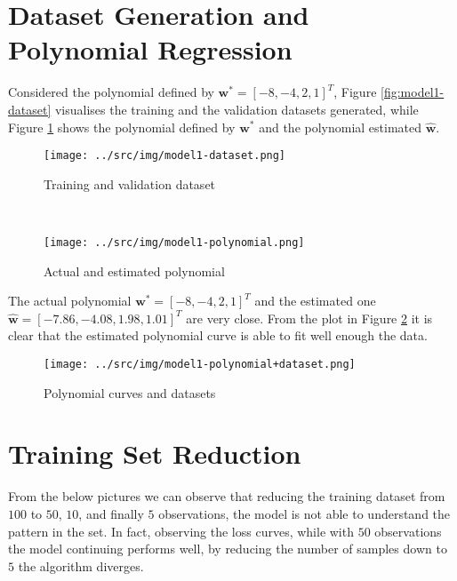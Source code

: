 \documentclass[a4paper,12pt]{article} %
\begin{document}
	\section{Dataset Generation and Polynomial Regression} 
	Considered the polynomial defined by $\textbf{w}^*=[-8,-4,2,1]^T$, Figure 
	\ref{fig:model1-dataset} visualises the training and the validation 
	datasets generated, while Figure \ref{fig:model1-polynomial} shows 
	the polynomial defined by $\textbf{w}^*$ and the polynomial estimated 
	$\hat{\textbf{w}}$.
	
	\begin{figure}[H]
		\begin{minipage}[c]{.5\textwidth}
			\centering
			\texttt{[image: ../src/img/model1-dataset.png]}
			\caption{Training and validation dataset}
			\label{fig:model1-dataset}
		\end{minipage}
		~
		\begin{minipage}[c]{.5\textwidth}
			\centering
			\texttt{[image: ../src/img/model1-polynomial.png]}
			\caption{Actual and estimated polynomial}
			\label{fig:model1-polynomial}
		\end{minipage}
	\end{figure}
	
 	The actual polynomial $\textbf{w}^*=[-8,-4,2,1]^T$ and the estimated one 	
 	$\hat{\textbf{w}}=[-7.86,-4.08,1.98,1.01]^T$ are very close.
 	From the plot in Figure \ref{fig:model1-polynomial+dataset} it is clear 
 	that the estimated polynomial curve is able to fit well enough the data.
 	
	\begin{figure}[H]
		\centering
		\texttt{[image: ../src/img/model1-polynomial+dataset.png]}
		\caption{Polynomial curves and datasets}
		\label{fig:model1-polynomial+dataset}
	\end{figure}
	
	\section{Training Set Reduction}
	From the below pictures we can observe that reducing the training dataset 
	from $100$ to $50$, $10$, and finally $5$ observations, the model is not 
	able to understand the pattern in the set. In fact, observing the loss 
	curves, while with $50$ observations the model continuing performs well, by 
	reducing the number of samples down to $5$ the algorithm diverges.
	
\end{document}
